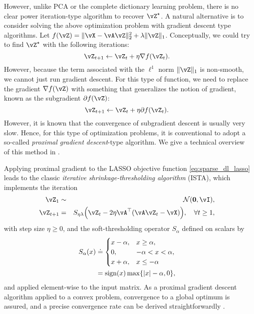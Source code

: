 \documentclass[../../book-main.tex]{subfiles}
\begin{document}
However, unlike PCA or the
complete dictionary learning problem, there is no clear power iteration-type
algorithm to recover \(\vZ^{\star}\). A natural alternative is to consider
solving the above optimization problem with gradient descent type algorithms.
Let \(f(\vZ) = \norm{\vX - \vA\vZ}_{2}^{2} + \lambda \norm{\vZ}_{1}\).
Conceptually, we could try to find \(\vZ^{\star}\) with the following iterations:
\begin{equation}
    \vZ_{t+1} \leftarrow \vZ_t + \eta \nabla f(\vZ_t).
\end{equation}
However, because the term associated with the \(\ell^1\) norm \(\norm{\vZ}_{1}\)
is non-smooth, we cannot just run gradient descent. For this type of function,
we need to replace the gradient \(\nabla f(\vZ)\) with something that
generalizes the notion of gradient, known as the subgradient \(\partial
f(\vZ)\):
\begin{equation}
    \vZ_{t+1} \leftarrow \vZ_t + \eta \partial f(\vZ_t).
\end{equation}
However, it is known that the convergence of subgradient descent is usually very
slow. Hence, for this type of optimization problems, it is conventional to adopt
a so-called {\em proximal gradient descent}-type algorithm. We give a technical
overview of this method in .

Applying proximal gradient to the LASSO objective function
\eqref{eq:sparse_dl_lasso} leads to the classic \textit{iterative
shrinkage-thresholding algorithm} (ISTA), which implements the iteration
\begin{eqnarray}
    \vZ_{1} &\sim& \dNorm(\vzero, \vI), \\
    \vZ_{t + 1} &=& S_{\eta\lambda}\rp{\vZ_{t} - 2\eta \vA^{\top}(\vA\vZ_{t} - \vX)}, \quad \forall t \geq 1,\label{eq:ista_update}
\end{eqnarray}
with step size \(\eta \geq 0\), and the soft-thresholding operator \(S_{\alpha}\) defined on scalars by
\begin{align}
    S_{\alpha}(x) &
    \doteq \begin{cases}x - \alpha, & x \geq \alpha, \\ 0,
    & -\alpha < x < \alpha, \\ x + \alpha, & x \leq -\alpha\end{cases}
    \\
    &=
    \sign(x) \max \set{\abs{x} - \alpha, 0},
\end{align}
and applied element-wise to the input matrix.  As a proximal gradient descent
algorithm applied to a convex problem, convergence to a global optimum is
assured, and a precise convergence rate can be derived straightforwardly
\cite{Wright-Ma-2022}. 
\end{document}
